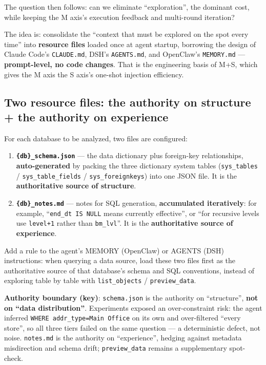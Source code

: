\documentclass[11pt]{article}
\begin{document}
The question then follows: can we eliminate ``exploration'', the dominant cost, while keeping the M axis's execution feedback and multi-round iteration?

The idea is: consolidate the ``context that must be explored on the spot every time'' into \textbf{resource files} loaded once at agent startup, borrowing the design of Claude Code's \texttt{CLAUDE.md}, DSH's \texttt{AGENTS.md}, and OpenClaw's \texttt{MEMORY.md} --- \textbf{prompt-level, no code changes}. That is the engineering basis of M+S, which gives the M axis the S axis's one-shot injection efficiency.

\subsection{Two resource files: the authority on structure + the authority on experience}

For each database to be analyzed, two files are configured:

\begin{enumerate}
\def\labelenumi{\arabic{enumi}.}
\item
  \textbf{\texttt{\{db\}\_schema.json}} --- the data dictionary plus foreign-key relationships, \textbf{auto-generated} by packing the three dictionary system tables (\texttt{sys\_tables} / \texttt{sys\_table\_fields} / \texttt{sys\_foreignkeys}) into one JSON file. It is the \textbf{authoritative source of structure}.
\item
  \textbf{\texttt{\{db\}\_notes.md}} --- notes for SQL generation, \textbf{accumulated iteratively}: for example, ``\texttt{end\_dt\ IS\ NULL} means currently effective'', or ``for recursive levels use \texttt{level+1} rather than \texttt{bm\_lvl}''. It is the \textbf{authoritative source of experience}.
\end{enumerate}

Add a rule to the agent's MEMORY (OpenClaw) or AGENTS (DSH) instructions: when querying a data source, load these two files first as the authoritative source of that database's schema and SQL conventions, instead of exploring table by table with \texttt{list\_objects} / \texttt{preview\_data}.

\textbf{Authority boundary (key)}: \texttt{schema.json} is the authority on ``structure'', \textbf{not on ``data distribution''}. Experiments exposed an over-constraint risk: the agent inferred \texttt{WHERE\ addr\_type=\textquotesingle{}Main\ Office\textquotesingle{}} on its own and over-filtered ``every store'', so all three tiers failed on the same question --- a deterministic defect, not noise. \texttt{notes.md} is the authority on ``experience'', hedging against metadata misdirection and schema drift; \texttt{preview\_data} remains a supplementary spot-check.
\end{document}
